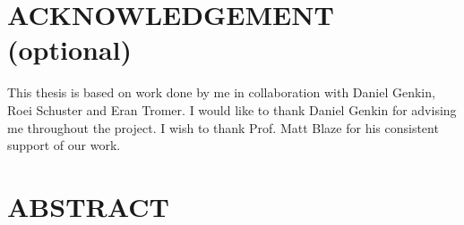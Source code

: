 \documentclass[11pt]{report} %
\begin{document}
    \newenvironment{preliminary}{}{}
    \titleformat{\chapter}[hang]{\large\center}{\thechapter}{0 pt}{}
    \titlespacing*{\chapter}{0pt}{-33 pt}{6 pt} %
    \begin{preliminary}
    
    
    
    \clearpage
    \chapter*{ACKNOWLEDGEMENT (optional)}
    \begin{center}
        \begin{minipage}{\textwidth}
            This thesis is based on work done by me in collaboration with Daniel Genkin, Roei Schuster and Eran Tromer. I would like to thank Daniel Genkin for advising me throughout the project. I wish to thank Prof. Matt Blaze for his consistent support of our work.
        \end{minipage}
    \end{center}  
    
    
    \clearpage
    \chapter*{\LARGE{ABSTRACT}}
    \begin{center}
    \mytitle
    
    
    

\end{center}
\end{preliminary}
\end{document}
